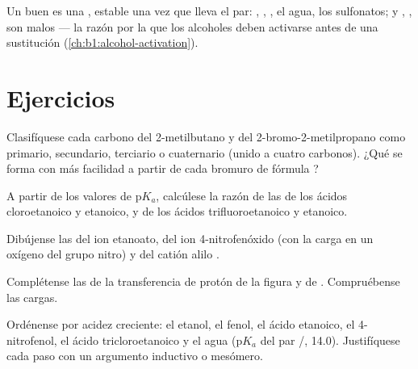 Un buen  es una , estable una vez que lleva el
par: , , , el agua, los sulfonatos;  y
, , son malos  --- la razón por la
que los alcoholes deben activarse antes de una sustitución
(\cref{ch:b1:alcohol-activation}).

\section{Ejercicios}

\begin{exercise}[$\star$]\label{exo:b1:electronic-effects:1}
Clasifíquese cada carbono del 2-metilbutano y del
2-bromo-2-metilpropano como primario, secundario, terciario o cuaternario
(unido a cuatro carbonos). ¿Qué  se forma con más facilidad a
partir de cada bromuro de fórmula ?
\end{exercise}

\begin{exercise}[$\star$]\label{exo:b1:electronic-effects:2}
A partir de los valores de $\mathrm{p}K_a$, calcúlese la razón de las
 de los ácidos cloroetanoico y etanoico, y de los
ácidos trifluoroetanoico y etanoico.
\end{exercise}

\begin{exercise}[$\star$]\label{exo:b1:electronic-effects:3}
Dibújense las  del ion etanoato, del ion 4-nitrofenóxido
(con la carga en un oxígeno del grupo nitro) y del catión alilo
.
\end{exercise}

\begin{exercise}[$\star$]\label{exo:b1:electronic-effects:4}
Complétense las  de la transferencia de protón de la
figura y de . Compruébense las cargas.
\end{exercise}

\begin{exercise}[$\star\star$]\label{exo:b1:electronic-effects:5}
Ordénense por acidez creciente: el etanol, el fenol, el ácido etanoico,
el 4-nitrofenol, el ácido tricloroetanoico y el agua ($\mathrm{p}K_a$ del
par /, 14.0). Justifíquese cada paso con un argumento
inductivo o mesómero.
\end{exercise}

